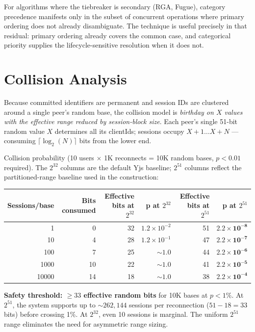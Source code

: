 For algorithms where the tiebreaker is secondary (RGA, Fugue), category precedence manifests only in the subset of concurrent operations where primary ordering does not already disambiguate. The technique is useful precisely in that residual: primary ordering already covers the common case, and categorical priority supplies the lifecycle-sensitive resolution when it does not.

\section{Collision Analysis}

Because committed identifiers are permanent and session IDs are clustered around a single peer's random base, the collision model is \emph{birthday on $X$ values with the effective range reduced by session-block size}. Each peer's single 51-bit random value $X$ determines all its clientIds; sessions occupy $X+1 \ldots X+N$ --- consuming $\lceil \log_2(N) \rceil$ bits from the lower end.

Collision probability (10 users $\times$ 1K reconnects = 10K random bases, $p < 0.01$ required). The $2^{32}$ columns are the default Yjs baseline; $2^{51}$ columns reflect the partitioned-range baseline used in the construction:

\begin{table}[ht]
\centering
\begin{tabular}{@{}rrrrrr@{}}
\toprule
\textbf{Sessions/base} & \textbf{Bits consumed} & \textbf{Effective bits at $2^{32}$} & \textbf{p at $2^{32}$} & \textbf{Effective bits at $2^{51}$} & \textbf{p at $2^{51}$} \\
\midrule
1 & 0 & 32 & $1.2 \times 10^{-2}$ & 51 & $\mathbf{2.2 \times 10^{-8}}$ \\
10 & 4 & 28 & $1.2 \times 10^{-1}$ & 47 & $\mathbf{2.2 \times 10^{-7}}$ \\
100 & 7 & 25 & ${\sim}1.0$ & 44 & $\mathbf{2.2 \times 10^{-6}}$ \\
1000 & 10 & 22 & ${\sim}1.0$ & 41 & $\mathbf{2.2 \times 10^{-5}}$ \\
10000 & 14 & 18 & ${\sim}1.0$ & 38 & $\mathbf{2.2 \times 10^{-4}}$ \\
\bottomrule
\end{tabular}
\end{table}

\textbf{Safety threshold: $\geq 33$ effective random bits} for 10K bases at $p < 1\%$. At $2^{51}$, the system supports up to ${\sim}262{,}144$ sessions per reconnection ($51 - 18 = 33$ bits) before crossing 1\%. At $2^{32}$, even 10 sessions is marginal. The uniform $2^{51}$ range eliminates the need for asymmetric range sizing.

